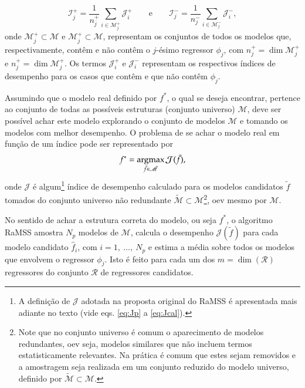 \begin{equation}
   \mathcal{I}^+_j = \frac{1}{n_j^+}\sum_{i \in \mathscr{M}_j^+}\mathcal{J}^{+}_{i} \qquad \text{e} \qquad \mathcal{I}^-_j = \frac{1}{n_j^-}\sum_{i \in \mathscr{M}_j^-}\mathcal{J}^{-}_{i},
\label{eq:avgRefPerf}
\end{equation}
onde $ \mathscr{M}^+_j \subset \mathscr{M}$ e $ \mathscr{M}^+_j \subset \mathscr{M}$, representam os conjuntos de todos os modelos que, respectivamente, contêm e não contêm o $j$-ésimo regressor $\phi_j$, com $n_j^+ = \dim \mathscr{M}^+_j $ e $n_j^+ = \dim \mathscr{M}^+_j$. Os termos $\mathcal{J}^{+}_{i}$ e  $\mathcal{J}^{-}_{i}$ representam os respectivos índices de desempenho para os casos que contêm e que não contêm $\phi_j$.




Assumindo que o modelo real definido por $f^*$, o qual se deseja encontrar, pertence ao conjunto de todas as possíveis estruturas (conjunto universo) $\mathscr{M}$, deve ser possível achar este modelo explorando o conjunto de modelos $\mathscr{M}$ e tomando os modelos com melhor desempenho.  O problema de se achar o modelo real em função de um índice pode ser representado por
\begin{equation}
   f^* = \operatorname*{argmax}_{\tilde{f} \in \tilde{\mathscr{M}}} \mathcal{J}(\tilde{f}),
\label{eq:fStar}
\end{equation}
onde $ \mathcal{J}$ é algum\footnote{A definição de $\mathcal{J}$ adotada na proposta original do RaMSS é apresentada mais adiante no texto (vide eqs. \ref{eq:Jp} a \ref{eq:Jcal}). } índice de desempenho calculado para os modelos candidatos $\tilde{f}$ tomados do conjunto universo não redundante  $\tilde{\mathscr{M}} \subset{\mathscr{M}}$\footnote{Note que no conjunto universo é comum o aparecimento de modelos redundantes, oev  seja, modelos similares que não incluem termos estatisticamente relevantes. Na prática é comum que estes sejam removidos e a amostragem seja realizada em um conjunto reduzido do modelo universo, definido por $\tilde{\mathscr{M}} \subset \mathscr{M}$.}, oev   mesmo por $ \mathscr{M}$.


No sentido de achar a estrutura correta do modelo, ou seja $ f^*$, o algoritmo RaMSS amostra $N_p$ modelos de $ \mathscr{M}$, calcula o desempenho $\mathcal{J}(\tilde{f})$ para cada modelo candidato $\hat{f}_{i}$, com $i=1,\ \dots,\ N_p$ e estima a média sobre todos os modelos que envolvem o regressor $\phi_j$. Isto é feito para cada um dos $m=\dim(\mathscr{R})$ regressores do conjunto $\mathscr{R}$ de regressores candidatos.

